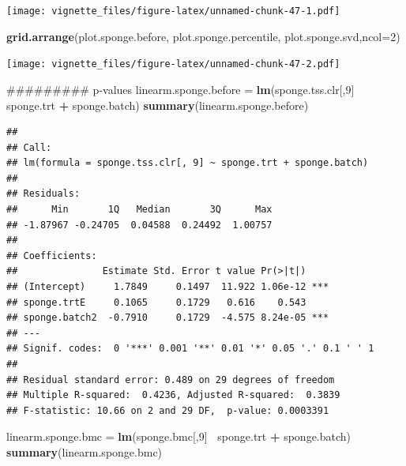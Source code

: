 \documentclass[]{book}
\newenvironment{Shaded}{\begin{snugshade}}{\end{snugshade}}
\newcommand{\KeywordTok}[1]{\textcolor[rgb]{0.13,0.29,0.53}{\textbf{#1}}}
\newcommand{\DataTypeTok}[1]{\textcolor[rgb]{0.13,0.29,0.53}{#1}}
\newcommand{\DecValTok}[1]{\textcolor[rgb]{0.00,0.00,0.81}{#1}}
\newcommand{\StringTok}[1]{\textcolor[rgb]{0.31,0.60,0.02}{#1}}
\newcommand{\OperatorTok}[1]{\textcolor[rgb]{0.81,0.36,0.00}{\textbf{#1}}}
\newcommand{\NormalTok}[1]{#1}
\begin{document}
\texttt{[image: vignette\_files/figure-latex/unnamed-chunk-47-1.pdf]}

\begin{Shaded}
\begin{Highlighting}[]
\KeywordTok{grid.arrange}\NormalTok{(plot.sponge.before, plot.sponge.percentile, plot.sponge.svd,}\DataTypeTok{ncol=}\DecValTok{2}\NormalTok{)}
\end{Highlighting}
\end{Shaded}

\texttt{[image: vignette\_files/figure-latex/unnamed-chunk-47-2.pdf]}

\begin{Shaded}
\begin{Highlighting}[]
\NormalTok{######### p-values}
\NormalTok{linearm.sponge.before =}\StringTok{ }\KeywordTok{lm}\NormalTok{(sponge.tss.clr[,}\DecValTok{9}\NormalTok{]}\OperatorTok{~}\StringTok{ }\NormalTok{sponge.trt }\OperatorTok{+}\StringTok{ }\NormalTok{sponge.batch)}
\KeywordTok{summary}\NormalTok{(linearm.sponge.before)}
\end{Highlighting}
\end{Shaded}

\begin{verbatim}
## 
## Call:
## lm(formula = sponge.tss.clr[, 9] ~ sponge.trt + sponge.batch)
## 
## Residuals:
##      Min       1Q   Median       3Q      Max 
## -1.87967 -0.24705  0.04588  0.24492  1.00757 
## 
## Coefficients:
##               Estimate Std. Error t value Pr(>|t|)    
## (Intercept)     1.7849     0.1497  11.922 1.06e-12 ***
## sponge.trtE     0.1065     0.1729   0.616    0.543    
## sponge.batch2  -0.7910     0.1729  -4.575 8.24e-05 ***
## ---
## Signif. codes:  0 '***' 0.001 '**' 0.01 '*' 0.05 '.' 0.1 ' ' 1
## 
## Residual standard error: 0.489 on 29 degrees of freedom
## Multiple R-squared:  0.4236, Adjusted R-squared:  0.3839 
## F-statistic: 10.66 on 2 and 29 DF,  p-value: 0.0003391
\end{verbatim}

\begin{Shaded}
\begin{Highlighting}[]
\NormalTok{linearm.sponge.bmc =}\StringTok{ }\KeywordTok{lm}\NormalTok{(sponge.bmc[,}\DecValTok{9}\NormalTok{]}\OperatorTok{~}\StringTok{ }\NormalTok{sponge.trt }\OperatorTok{+}\StringTok{ }\NormalTok{sponge.batch)}
\KeywordTok{summary}\NormalTok{(linearm.sponge.bmc)}
\end{Highlighting}
\end{Shaded}
\end{document}
